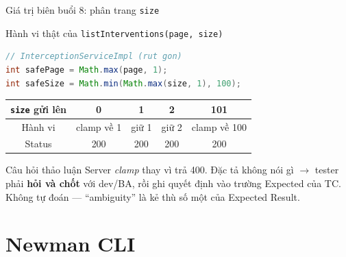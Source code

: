 \documentclass[aspectratio=169,12pt]{beamer}
\begin{document}
\begin{frame}[fragile]{Giá trị biên buổi 8: phân trang \texttt{size}}
  \begin{block}{Hành vi thật của \texttt{listInterventions(page, size)}}
\begin{lstlisting}[language=Java]
// InterceptionServiceImpl (rut gon)
int safePage = Math.max(page, 1);
int safeSize = Math.min(Math.max(size, 1), 100);
\end{lstlisting}
  \end{block}

  \begin{center}
  \small
  \begin{tabular}{ccccc}
    \toprule
    \texttt{size} gửi lên & 0 & 1 & 2 & 101 \\
    \midrule
    Hành vi & clamp về 1 & giữ 1 & giữ 2 & clamp về 100 \\
    Status  & 200 & 200 & 200 & 200 \\
    \bottomrule
  \end{tabular}
  \end{center}

  \begin{alertblock}{Câu hỏi thảo luận}
    Server \emph{clamp} thay vì trả 400. Đặc tả không nói gì
    $\to$ tester phải \textbf{hỏi và chốt} với dev/BA, rồi ghi quyết định vào
    trường Expected của TC. Không tự đoán --- ``ambiguity'' là kẻ thù số một
    của Expected Result.
  \end{alertblock}
\end{frame}

\section{Newman CLI}
\end{document}
